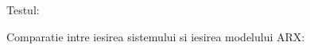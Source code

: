 \documentclass[12pt,english]{article}
\begin{document}
\begin{center}
\end{center}

Testul:
\begin{center}
\end{center}

Comparatie intre iesirea sistemului si iesirea modelului ARX:
\begin{center}
\end{center}
\end{document}
